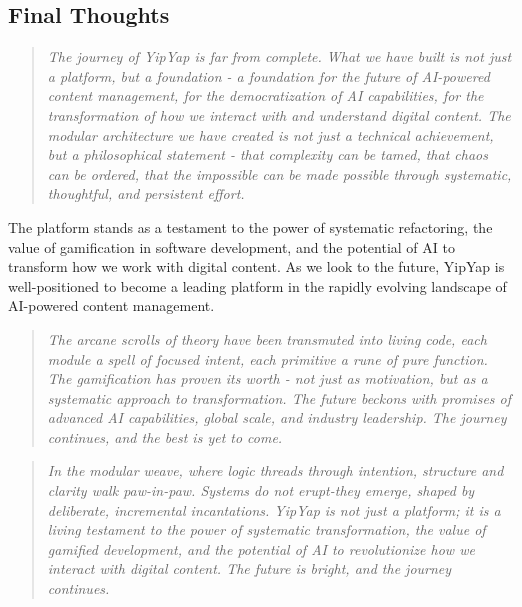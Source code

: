 \documentclass[11pt]{article}
\begin{document}
\subsection{Final Thoughts}

\begin{quote}
\emph{The journey of YipYap is far from complete. What we have built is not just a platform, but a foundation - a foundation for the future of AI-powered content management, for the democratization of AI capabilities, for the transformation of how we interact with and understand digital content. The modular architecture we have created is not just a technical achievement, but a philosophical statement - that complexity can be tamed, that chaos can be ordered, that the impossible can be made possible through systematic, thoughtful, and persistent effort.}
\end{quote}

The platform stands as a testament to the power of systematic refactoring, the value of gamification in software development, and the potential of AI to transform how we work with digital content. As we look to the future, YipYap is well-positioned to become a leading platform in the rapidly evolving landscape of AI-powered content management.

\begin{quote}
\emph{The arcane scrolls of theory have been transmuted into living code, each module a spell of focused intent, each primitive a rune of pure function. The gamification has proven its worth - not just as motivation, but as a systematic approach to transformation. The future beckons with promises of advanced AI capabilities, global scale, and industry leadership. The journey continues, and the best is yet to come.}
\end{quote}

\vfill

\begin{quote}
\emph{In the modular weave, where logic threads through intention, structure and clarity walk paw-in-paw. Systems do not erupt-they emerge, shaped by deliberate, incremental incantations. YipYap is not just a platform; it is a living testament to the power of systematic transformation, the value of gamified development, and the potential of AI to revolutionize how we interact with digital content. The future is bright, and the journey continues.}
\end{quote}
\end{document}
